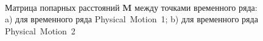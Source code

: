 \begin{figure}[h!t]\center
{}
\\
\caption{Матрица попарных расстояний $\textbf{M}$ между точками временного ряда: a) для временного ряда Physical~Motion~1; b) для временного ряда Physical~Motion~2}
\label{fig_real_distance}
\end{figure}

